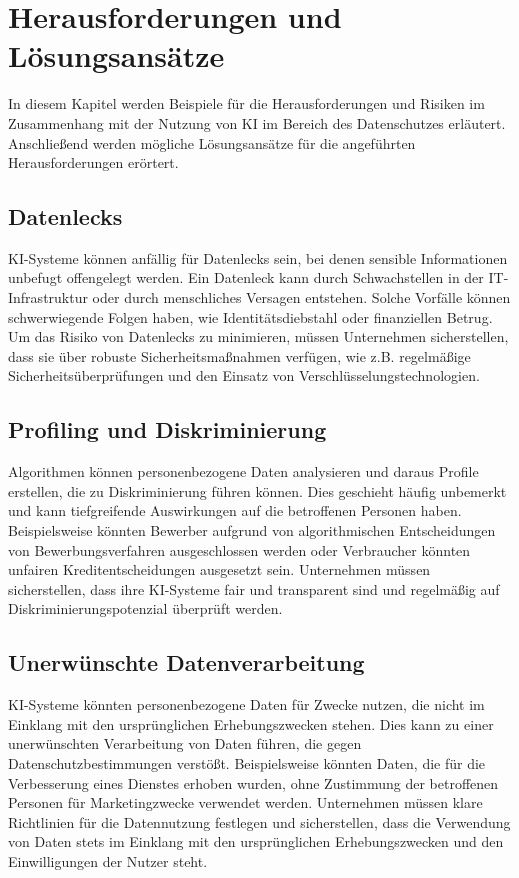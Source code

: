 \chapter{Herausforderungen und Lösungsansätze}

In diesem Kapitel werden Beispiele für die Herausforderungen und Risiken im
Zusammenhang mit der Nutzung von KI im Bereich des Datenschutzes erläutert.
Anschließend werden mögliche Lösungsansätze für die angeführten
Herausforderungen erörtert.

\section{Datenlecks}

KI-Systeme können anfällig für Datenlecks sein, bei denen sensible Informationen
unbefugt offengelegt werden. Ein Datenleck kann durch Schwachstellen in der
IT-Infrastruktur oder durch menschliches Versagen entstehen. Solche Vorfälle
können schwerwiegende Folgen haben, wie Identitätsdiebstahl oder finanziellen
Betrug. Um das Risiko von Datenlecks zu minimieren, müssen Unternehmen
sicherstellen, dass sie über robuste Sicherheitsmaßnahmen verfügen, wie z.B.
regelmäßige Sicherheitsüberprüfungen und den Einsatz von
Verschlüsselungstechnologien.

\section{Profiling und Diskriminierung}

Algorithmen können personenbezogene Daten analysieren und daraus Profile
erstellen, die zu Diskriminierung führen können. Dies geschieht häufig unbemerkt
und kann tiefgreifende Auswirkungen auf die betroffenen Personen haben.
Beispielsweise könnten Bewerber aufgrund von algorithmischen Entscheidungen von
Bewerbungsverfahren ausgeschlossen werden oder Verbraucher könnten unfairen
Kreditentscheidungen ausgesetzt sein. Unternehmen müssen sicherstellen, dass
ihre KI-Systeme fair und transparent sind und regelmäßig auf
Diskriminierungspotenzial überprüft werden.

\section{Unerwünschte Datenverarbeitung}

KI-Systeme könnten personenbezogene Daten für Zwecke nutzen, die nicht im
Einklang mit den ursprünglichen Erhebungszwecken stehen. Dies kann zu einer
unerwünschten Verarbeitung von Daten führen, die gegen Datenschutzbestimmungen
verstößt. Beispielsweise könnten Daten, die für die Verbesserung eines Dienstes
erhoben wurden, ohne Zustimmung der betroffenen Personen für Marketingzwecke
verwendet werden. Unternehmen müssen klare Richtlinien für die Datennutzung
festlegen und sicherstellen, dass die Verwendung von Daten stets im Einklang mit
den ursprünglichen Erhebungszwecken und den Einwilligungen der Nutzer steht.

